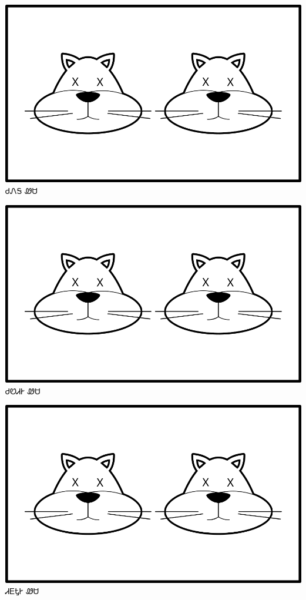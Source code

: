 \documentclass[avery5371]{flashcards}%
\begin{document}
    \begin{flashcard}{
        \includegraphics[width=0.95\columnwidth,height=.51\columnwidth,keepaspectratio]{../artwork/for-colors/wesa-tali-dead}
    }
        \Huge ᏧᏁᎦ ᏪᏌ
    \end{flashcard}
    \begin{flashcard}{
        \includegraphics[width=0.95\columnwidth,height=.51\columnwidth,keepaspectratio]{../artwork/for-colors/wesa-tali-dead}
    }
        \Huge ᏧᏬᏗᎨ ᏪᏌ
    \end{flashcard}
    \begin{flashcard}{
        \includegraphics[width=0.95\columnwidth,height=.51\columnwidth,keepaspectratio]{../artwork/for-colors/wesa-tali-dead}
    }
        \Huge ᏗᎬᎿᎨ ᏪᏌ
    \end{flashcard}
\end{document}
